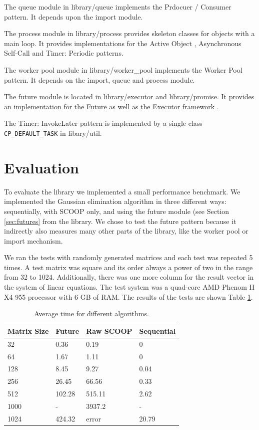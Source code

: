 \documentclass[a4paper,10pt]{article}
\newcommand{\dir} [1] [] {#1}
\begin{document}
The queue module in \dir{library/queue} implements the Prdocuer / Consumer  pattern.
It depends upon the import module.

The process module in \dir{library/process} provides skeleton classes for objects with a main loop.
It provides implementations for the Active Object , Asynchronous Self-Call  and Timer: Periodic  patterns.

The worker pool module in \dir{library/worker\_pool} implements the Worker Pool  pattern.
It depends on the import, queue and process module.

The future module is located in \dir{library/executor} and \dir{library/promise}.
It provides an implementation for the Future  as well as the Executor framework .

The Timer: InvokeLater pattern  is implemented by a single class \lstinline!CP_DEFAULT_TASK! in \dir{libary/util}.



\section{Evaluation}
\label {sec:evaluation}

To evaluate the library we implemented a small performance benchmark.
We implemented the Gaussian elimination algorithm in three different ways: sequentially, with SCOOP only, and using the future module (see Section \ref{sec:futures} from the library.
We chose to test the future pattern because it indirectly also measures many other parts of the library, like the worker pool or import mechanism.

We ran the tests with randomly generated matrices and each test was repeated 5 times.
A test matrix was square and its order always a power of two in the range from 32 to 1024.
Additionally, there was one more column for the result vector in the system of linear equations.
The test system was a quad-core AMD Phenom II X4 955 processor with 6 GB of RAM.
The results of the tests are shown Table \ref{table:perf-results}.

\begin{table} [!h]
\centering
\begin{tabular}{|l|l l l|} 
\hline
Matrix Size & Future & Raw SCOOP & Sequential\\
\hline
32 & 0.36 & 0.19 & 0\\
64 & 1.67 & 1.11 & 0\\
128 & 8.45 & 9.27 & 0.04\\
256 & 26.45 & 66.56 & 0.33\\
512 & 102.28 & 515.11 & 2.62\\
1000 & - &  3937.2 & - \\
1024 & 424.32 & error & 20.79 \\
\hline
\end{tabular}
\caption{Average time for different algorithms.}
\label{table:perf-results}
\end{table}
\end{document}
